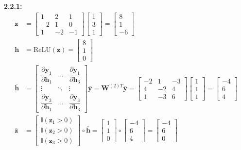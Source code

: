 \documentclass[12pt]{article}
\newcommand{\m}[1]{\mathbf{#1}}
\newcommand{\ol}[1]{\overline{#1}}
\begin{document}
\textbf{2.2.1:}
\begin{align*}
    \m z &= \begin{bmatrix} 1 & 2 & 1 \\ -2 & 1 & 0 \\ 1 & -2 & -1 \end{bmatrix} \begin{bmatrix} 1 \\ 3 \\ 1 \end{bmatrix} = \begin{bmatrix} 8 \\ 1 \\ -6 \end{bmatrix}\\
    \m h &= \text{ReLU}(\m z) = \begin{bmatrix} 8 \\ 1 \\ 0 \end{bmatrix}\\
    \ol{\m h} &= \begin{bmatrix} \dfrac{\partial\m y_1}{\partial\m h_1} & \dots & \dfrac{\partial\m y_1}{\partial\m h_3} \\ \vdots & \ddots & \vdots \\ \dfrac{\partial\m y_3}{\partial\m h_1} & \dots & \dfrac{\partial\m y_3}{\partial\m h_3} \end{bmatrix} \ol{\m y} = \m W^{(2)T} \ol{\m y} = \begin{bmatrix} -2 & 1 & -3 \\ 4 & -2 & 4 \\ 1 & -3 & 6 \end{bmatrix}\begin{bmatrix} 1 \\ 1 \\ 1 \end{bmatrix} = \begin{bmatrix} -4 \\ 6 \\ 4 \end{bmatrix}\\
    \ol{\m z} &= \begin{bmatrix} \mathbb{I}(\m z_1 > 0) \\ \mathbb{I}(\m z_2 > 0) \\ \mathbb{I}(\m z_3 > 0) \end{bmatrix} \circ \ol{\m h} = \begin{bmatrix} 1 \\ 1 \\ 0 \end{bmatrix} \circ \begin{bmatrix} -4 \\ 6 \\ 4 \end{bmatrix} = \begin{bmatrix} -4 \\ 6 \\ 0 \end{bmatrix}\\

\end{align*}
\end{document}
